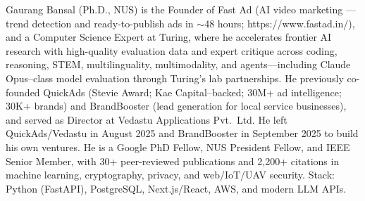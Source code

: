 \par{
Gaurang Bansal (Ph.D., NUS) is the Founder of Fast Ad (AI video marketing --- trend detection and ready-to-publish ads in $\sim$48 hours; https://www.fastad.in/), and a Computer Science Expert at Turing, where he accelerates frontier AI research with high-quality evaluation data and expert critique across coding, reasoning, STEM, multilinguality, multimodality, and agents---including Claude Opus--class model evaluation through Turing's lab partnerships. He previously co-founded QuickAds (Stevie Award; Kae Capital--backed; 30M+ ad intelligence; 30K+ brands) and BrandBooster (lead generation for local service businesses), and served as Director at Vedastu Applications Pvt.\ Ltd. He left QuickAds/Vedastu in August 2025 and BrandBooster in September 2025 to build his own ventures. He is a Google PhD Fellow, NUS President Fellow, and IEEE Senior Member, with 30+ peer-reviewed publications and 2,200+ citations in machine learning, cryptography, privacy, and web/IoT/UAV security. Stack: Python (FastAPI), PostgreSQL, Next.js/React, AWS, and modern LLM APIs.
}
